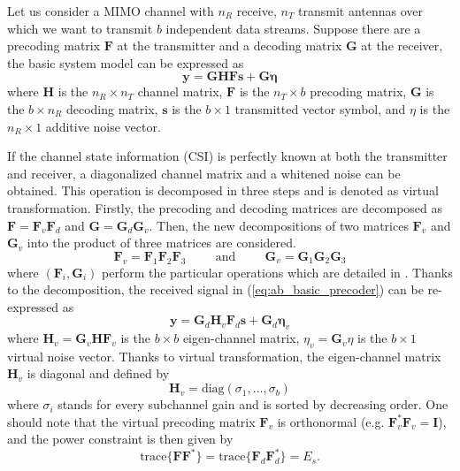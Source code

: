 Let us consider a MIMO channel with $n_R$ receive,  $n_T$ transmit antennas over which we want to transmit $b$ independent data streams. Suppose there are a precoding matrix $\mathbf{F}$ at the transmitter and a decoding matrix $\mathbf{G}$ at the receiver, the basic system model can be expressed as 
\begin{equation}
	\mathbf{y}=\mathbf{G}\mathbf{H}\mathbf{F}\mathbf{s}+\mathbf{G}\mathbf{\eta}
	\label{eq:ab_basic_precoder}
\end{equation}
where $\mathbf{H}$ is the $n_R \times n_T$ channel matrix, $\mathbf{F}$ is the $n_T \times b$ precoding matrix, $\mathbf{G}$ is the $b \times n_R$ decoding matrix, $\mathbf{s}$ is the $b \times 1$ transmitted vector symbol, and $\eta$ is the $n_R \times 1$ additive noise vector. 

If the channel state information (CSI) is perfectly known at both the transmitter and receiver, a diagonalized channel matrix and a whitened noise can be obtained. This operation is decomposed in three steps and is denoted as virtual transformation. Firstly, the precoding and decoding matrices are decomposed as $\mathbf{F}=\mathbf{F}_v\mathbf{F}_d $ and $\mathbf{G}=\mathbf{G}_d\mathbf{G}_v$. Then, the new decompositions of two matrices $\mathbf{F}_v$ and $\mathbf{G}_v$ into the product of three matrices are considered. 
\begin{equation}
\mathbf{F}_v = \mathbf{F}_1 \mathbf{F}_2 \mathbf{F}_3 \hspace{1cm} \text{and} \hspace{1cm} \mathbf{G}_v = \mathbf{G}_1 \mathbf{G}_2 \mathbf{G}_3
\end{equation}
where $(\mathbf{F}_i, \mathbf{G}_i)$ perform the particular operations which are detailed in \cite{collin2004omd}. Thanks to the decomposition, the received signal in (\ref{eq:ab_basic_precoder}) can be re-expressed as
\begin{equation}
\label{eq:ab_virtual_precoder}
	\mathbf{y}=\mathbf{G}_d\mathbf{H}_v\mathbf{F}_d\mathbf{s}+\mathbf{G}_d\mathbf{\eta}_v
\end{equation}
where $\mathbf{H}_v=\mathbf{G}_v\mathbf{H}\mathbf{F}_v$ is the $b \times b$ eigen-channel matrix, $\eta_v=\mathbf{G}_v\eta$  is the $b \times 1$ virtual noise vector. Thanks to virtual transformation, the eigen-channel matrix $\mathbf{H}_v$ is diagonal and defined by
\begin{equation}
	\mathbf{H}_v=\text{diag}(\sigma_1,...,\sigma_b)
\end{equation}
where $\sigma_i$ stands for every subchannel gain and is sorted by  decreasing order. One should note that the virtual precoding matrix $\mathbf{F}_v$ is orthonormal (e.g. $\mathbf{F}_v^*\mathbf{F}_v=\mathbf{I}$), and the power constraint is then given by
\begin{equation}
\label{eq:ab_power_constraint}
	\text{trace}\{\mathbf{F} \mathbf{F}^*\}=\text{trace}\{\mathbf{F}_d\mathbf{F}_d^*\}= E_s .
\end{equation}

